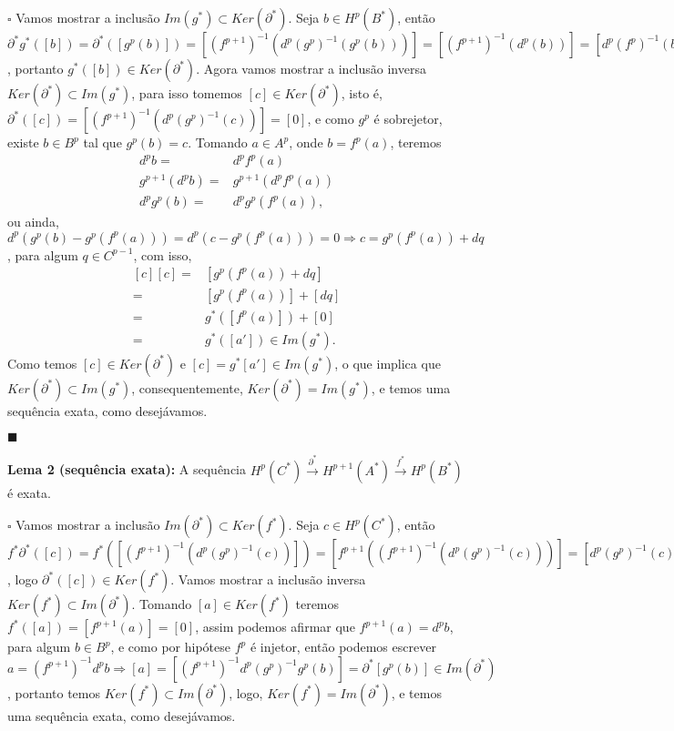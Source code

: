 \documentclass{article}
\begin{document}
	$\square$ Vamos mostrar a inclusão $Im(g^{*}) \subset Ker(\partial^{*})$. Seja $b \in H^{p}(B^{*})$, então $\partial^{*}g^{*}([b]) = \partial^{*}([g^{p}(b)]) = [(f^{p+1})^{-1}(d^{p}(g^{p})^{-1}(g^{p}(b)))] = [(f^{p+1})^{-1}(d^{p}(b))] = [d^{p}(f^{p})^{-1}(b)] = [0]$, portanto $g^{*}([b]) \in Ker(\partial^{*})$. Agora vamos mostrar a inclusão inversa $Ker(\partial^{*}) \subset Im(g^{*})$, para isso tomemos $[c] \in Ker(\partial^{*})$, isto é, $\partial^{*}([c]) = [(f^{p+1})^{-1}(d^{p}(g^{p})^{-1}(c))] = [0]$, e como $g^{p}$ é sobrejetor, existe $b \in B^{p}$ tal que $g^{p}(b) = c$. Tomando $a \in A^{p}$, onde $b = f^{p}(a)$, teremos 
	$$
	\begin{aligned}
	d^{p}b =& d^{p}f^{p}(a)
	\\
	g^{p+1}(d^{p}b) =&  g^{p+1}(d^{p}f^{p}(a)) 
	\\
	d^{p}g^{p}(b) =& d^{p}g^{p}(f^{p}(a)),
	\end{aligned}
	$$
	ou ainda, $d^{p}(g^{p}(b) - g^{p}(f^{p}(a)))=d^{p}(c - g^{p}(f^{p}(a)))=0 \Rightarrow c = g^{p}(f^{p}(a)) + dq$, para algum $q \in C^{p-1}$, com isso, 
	$$
	\begin{aligned}
	[c][c] =& [g^{p}(f^{p}(a)) + dq] 
	\\
	=& [g^{p}(f^{p}(a))] + [dq] 
	\\
	=& g^{*}([f^{p}(a)]) +[0] 
	\\
	=& g^{*}([a']) \in  Im(g^{*}).
	\end{aligned}
	$$
	Como temos $[c] \in Ker(\partial^{*})$ e $[c] = g^{*}[a'] \in Im(g^{*})$, o que implica que $Ker(\partial^{*}) \subset Im(g^{*})$, consequentemente, $Ker(\partial^{*}) = Im(g^{*})$, e temos uma sequência exata, como desejávamos. 
	
	$\blacksquare$
	
	\vspace{2mm}
	\textbf{Lema 2 (sequência exata):} A sequência $H^{p}(C^{*}) \xrightarrow{\partial^{*}} H^{p+1}(A^{*}) \xrightarrow{f^{*}}  H^{p}(B^{*})$ é exata.
	
	$\square$ Vamos mostrar a inclusão  $Im(\partial^{*}) \subset Ker(f^{*})$. Seja $c \in H^{p}(C^{*})$, então $f^{*}\partial^{*}([c]) = f^{*}([(f^{p+1})^{-1}(d^{p}(g^{p})^{-1}(c))]) = [f^{p+1}((f^{p+1})^{-1}(d^{p}(g^{p})^{-1}(c)))] = [d^{p}(g^{p})^{-1}(c)] = [0]$, logo $\partial^{*}([c]) \in Ker(f^{*})$. Vamos mostrar a inclusão inversa $Ker(f^{*}) \subset Im(\partial^{*}) $. Tomando $[a] \in Ker(f^{*})$ teremos $f^{*}([a]) = [f^{p+1}(a)] = [0]$, assim podemos afirmar que $f^{p+1}(a) = d^{p}b$, para algum $b \in B^{p}$, e como por hipótese $f^{p}$ é injetor, então podemos escrever $a = (f^{p+1})^{-1}d^{p}b \Rightarrow [a] = [(f^{p+1})^{-1}d^{p}(g^{p})^{-1}g^{p}(b)] = \partial^{*}[g^{p}(b)] \in Im(\partial^{*})$, portanto temos $Ker(f^{*}) \subset Im(\partial^{*})$, logo, $Ker(f^{*}) = Im(\partial^{*})$, e temos uma sequência exata, como desejávamos. 
	
\end{document}

